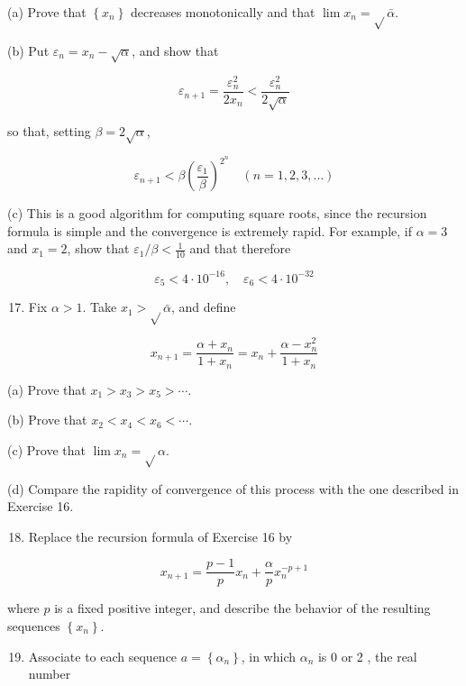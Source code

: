 \documentclass[10pt]{article}
\begin{document}
(a) Prove that $\left\{x_{n}\right\}$ decreases monotonically and that $\lim x_{n}=\sqrt{ } \bar{\alpha}$.

(b) Put $\varepsilon_{n}=x_{n}-\sqrt{\alpha}$, and show that

$$
\varepsilon_{n+1}=\frac{\varepsilon_{n}^{2}}{2 x_{n}}<\frac{\varepsilon_{n}^{2}}{2 \sqrt{\alpha}}
$$

so that, setting $\beta=2 \sqrt{\alpha}$,

$$
\varepsilon_{n+1}<\beta\left(\frac{\varepsilon_{1}}{\beta}\right)^{2^{n}} \quad(n=1,2,3, \ldots)
$$

(c) This is a good algorithm for computing square roots, since the recursion formula is simple and the convergence is extremely rapid. For example, if $\alpha=3$ and $x_{1}=2$, show that $\varepsilon_{1} / \beta<\frac{1}{10}$ and that therefore

$$
\varepsilon_{5}<4 \cdot 10^{-16}, \quad \varepsilon_{6}<4 \cdot 10^{-32}
$$

\begin{enumerate}
  \setcounter{enumi}{16}
  \item Fix $\alpha>1$. Take $x_{1}>\sqrt{ } \bar{\alpha}$, and define
\end{enumerate}

$$
x_{n+1}=\frac{\alpha+x_{n}}{1+x_{n}}=x_{n}+\frac{\alpha-x_{n}^{2}}{1+x_{n}}
$$

(a) Prove that $x_{1}>x_{3}>x_{5}>\cdots$.

(b) Prove that $x_{2}<x_{4}<x_{6}<\cdots$.

(c) Prove that $\lim x_{n}=\sqrt{ } \alpha$.

(d) Compare the rapidity of convergence of this process with the one described in Exercise 16.

\begin{enumerate}
  \setcounter{enumi}{17}
  \item Replace the recursion formula of Exercise 16 by
\end{enumerate}

$$
x_{n+1}=\frac{p-1}{p} x_{n}+\frac{\alpha}{p} x_{n}^{-p+1}
$$

where $p$ is a fixed positive integer, and describe the behavior of the resulting sequences $\left\{x_{n}\right\}$.

\begin{enumerate}
  \setcounter{enumi}{18}
  \item Associate to each sequence $a=\left\{\alpha_{n}\right\}$, in which $\alpha_{n}$ is 0 or 2 , the real number
\end{enumerate}
\end{document}
